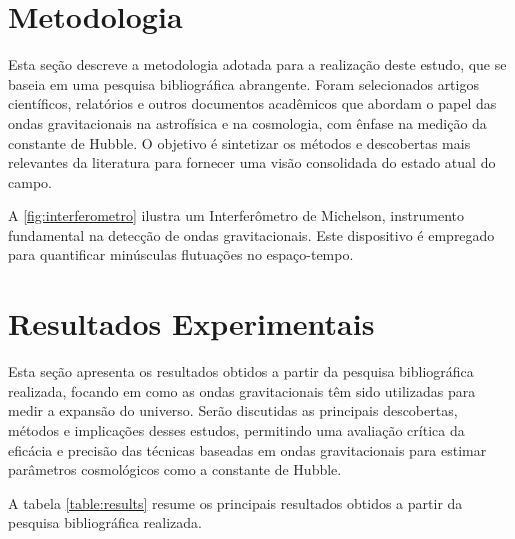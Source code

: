\documentclass[12pt,oneside,a4paper,chapter=TITLE,section=TITLE,sumario
=tradicional]{abntex2}
\begin{document}
\chapter{Metodologia}
\label{cap:metodologia}

Esta seção descreve a metodologia adotada para a realização deste estudo, que se baseia em uma pesquisa bibliográfica abrangente. Foram selecionados artigos científicos, relatórios e outros documentos acadêmicos que abordam o papel das ondas gravitacionais na astrofísica e na cosmologia, com ênfase na medição da constante de Hubble. O objetivo é sintetizar os métodos e descobertas mais relevantes da literatura para fornecer uma visão consolidada do estado atual do campo.

A \autoref{fig:interferometro} ilustra um Interferômetro de Michelson, instrumento fundamental na detecção de ondas gravitacionais. Este dispositivo é empregado para quantificar minúsculas flutuações no espaço-tempo.
\begin{figure}[h]
\end{figure}

\chapter{Resultados Experimentais}
\label{cap:resultados}

Esta seção apresenta os resultados obtidos a partir da pesquisa bibliográfica realizada, focando em como as ondas gravitacionais têm sido utilizadas para medir a expansão do universo. Serão discutidas as principais descobertas, métodos e implicações desses estudos, permitindo uma avaliação crítica da eficácia e precisão das técnicas baseadas em ondas gravitacionais para estimar parâmetros cosmológicos como a constante de Hubble.

A tabela \ref{table:results} resume os principais resultados obtidos a partir da pesquisa bibliográfica realizada.
\end{document}
